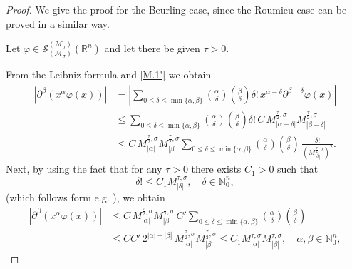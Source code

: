 \documentclass{article}
\theoremstyle{thmstyleone}
\theoremstyle{thmstyletwo}%
\theoremstyle{thmstylethree}%
\begin{document}
\begin{proof}
We give the proof  for the Beurling case, 
since the Roumieu case can be proved in a similar way. 
  
  Let 
  $\varphi\in \mathcal S_{(\mathcal{M}_\sigma)}^{(\mathcal{M}_\sigma)} (\mathbb R^n)$ and let there  be given $\tau>0$.
  
  

   
  From the Leibniz formula and \eqref{M.1'} we obtain
   \begin{align*}
       |\partial^\beta(x^\alpha \varphi(x))|& =\left|\sum_{0\leq\delta\leq\min\{\alpha,\beta\}} \binom{\alpha}{\delta}\binom{\beta}{\delta}\delta!\,x^{\alpha-\delta}\partial^{\beta-\delta}\varphi(x) \right |\\
       &\leq \sum_{0\leq\delta\leq\min\{\alpha,\beta\}} \binom{\alpha}{\delta}\binom{\beta}{\delta}\delta!\, C\, M^{\frac{\tau}{2},\sigma}_{|\alpha-\delta|} M^{\frac{\tau}{2},\sigma}_{|\beta-\delta|}\\
       &\leq C\, M^{\frac{\tau}{2},\sigma}_{|\alpha|} M^{\frac{\tau}{2},\sigma}_{|\beta|} \sum_{0\leq\delta\leq\min\{\alpha,\beta\}} \binom{\alpha}{\delta}\binom{\beta}{\delta}\, \frac{\delta!}{(M_{|\delta|}^{\frac{\tau}{2},\sigma})^2} .
\end{align*}
Next, by using the fact  that for any $\tau>0$ there exists $C_1>0$ such that 
\begin{equation}\label{gevr to us}
    \delta!\leq C_1 M_{|\delta|}^{\tau,\sigma},\quad \delta\in \mathbb N_0^n,
\end{equation}
(which follows form e.g. \cite[(4)]{TTZ2024}), we obtain
\begin{align*}
       |\partial^\beta(x^\alpha \varphi(x))| &\leq C\, M^{\frac{\tau}{2},\sigma}_{|\alpha|} M^{\frac{\tau}{2},\sigma}_{|\beta|}\, C' \sum_{0\leq\delta\leq\min\{\alpha,\beta\}} \binom{\alpha}{\delta}\binom{\beta}{\delta}\\
       &\leq C C'\,2^{|\alpha|+|\beta|}\, M^{\frac{\tau}{2},\sigma}_{|\alpha|} M^{\frac{\tau}{2},\sigma}_{|\beta|}\leq C_1  M^{\tau,\sigma}_{|\alpha|} M^{\tau,\sigma}_{|\beta|},\quad \alpha,\beta\in\mathbb N_0^n,

\end{align*}
\end{proof}
\end{document}
